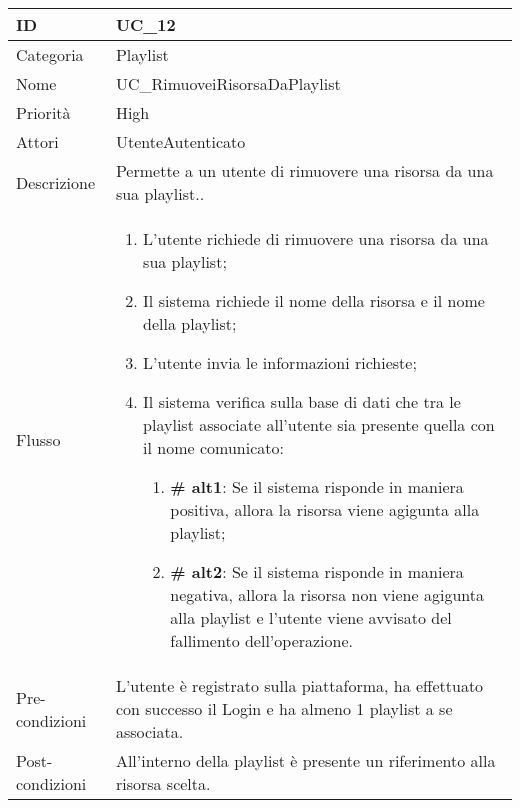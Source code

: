 \begin{center}
\begin{tabular}{ |p{2cm}|p{13cm}|  }
\hline
ID & UC\_12 \\\hline
Categoria & Playlist\\\hline
Nome & UC\_RimuoveiRisorsaDaPlaylist\\\hline
Priorità & High \\\hline
Attori &  UtenteAutenticato \\\hline
Descrizione & Permette a un utente di rimuovere una risorsa da una sua playlist..\\\hline
Flusso &  	\begin{enumerate}
			\item L'utente richiede di rimuovere una risorsa da una sua playlist;
			\item Il sistema richiede il nome della risorsa e il nome della playlist;
			\item L'utente invia le informazioni richieste;
			\item Il sistema verifica sulla base di dati che tra le playlist associate all'utente sia presente quella con il nome comunicato:
			\begin{enumerate}[  ]
				\item \textbf{\# alt1}: Se il sistema risponde in maniera positiva, allora la risorsa viene agigunta alla playlist;
				\item \textbf{\# alt2}: Se il sistema risponde in maniera negativa, allora la risorsa non viene  agigunta alla playlist e l'utente viene avvisato del fallimento dell'operazione.
			\end{enumerate}
		\end{enumerate}\\\hline
Pre-condizioni & L'utente è registrato sulla piattaforma, ha effettuato con successo il Login e ha almeno 1 playlist a se associata.\\\hline
Post-condizioni & All'interno della playlist è presente un riferimento alla risorsa scelta.\\\hline
\end{tabular}
\label{table_use_case:12}\newline


\end{center}
